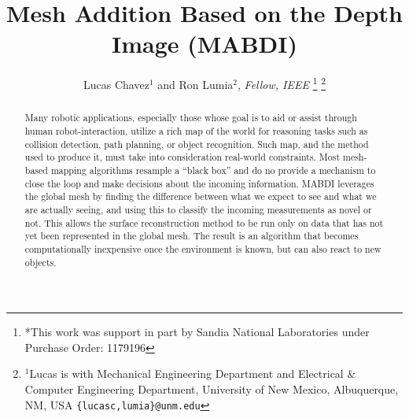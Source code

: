 \documentclass[letterpaper, 10 pt, conference]{ieeeconf}  %
\title{\LARGE \bf
Mesh Addition Based on the Depth Image (MABDI)
}
\author{Lucas Chavez$^{1}$ and Ron Lumia$^{2}$, \textit{Fellow, IEEE}%
\thanks{*This work was support in part by Sandia National Laboratories under Purchase Order: 1179196}%
\thanks{$^{1}$Lucas is with Mechanical Engineering Department and Electrical \& Computer Engineering Department, University of New Mexico,
	Albuquerque, NM, USA
        {\tt\small \{lucasc,lumia\}@unm.edu}}%
}
\begin{document}
\maketitle
\thispagestyle{empty}
\pagestyle{empty}


\begin{abstract}


Many robotic applications, especially those whose goal is to aid or assist
through human robot-interaction, utilize a rich map of the world for reasoning
tasks such as collision detection, path planning, or object recognition. Such
map, and the method used to produce it, must take into consideration real-world
constraints. Most mesh-based mapping algorithms resample a ``black box'' and do
no provide a mechanism to close the loop and make decisions about the
incoming information. MABDI leverages the global mesh by finding the difference
between what we expect to see and what we are actually seeing, and using this to
classify the incoming measurements as novel or not. This allows the surface
reconstruction method to be run only on data that has not yet been represented in
the global mesh. The result is an algorithm that becomes computationally
inexpensive once the environment is known, but can also react to new objects.


\end{abstract}









% 

% 




\end{document}
